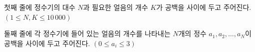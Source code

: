 첫째 줄에 정수기의 대수 $N$과 필요한 얼음의 개수 $K$가 공백을 사이에 두고 주어진다. $(1\le N, K\le 10\,000)$

둘째 줄에 각 정수기에 들어 있는 얼음의 개수를 나타내는 $N$개의 정수 $a_1,a_2,\ldots,a_N$이 공백을 사이에 두고 주어진다. $(0\le a_i\le 3)$